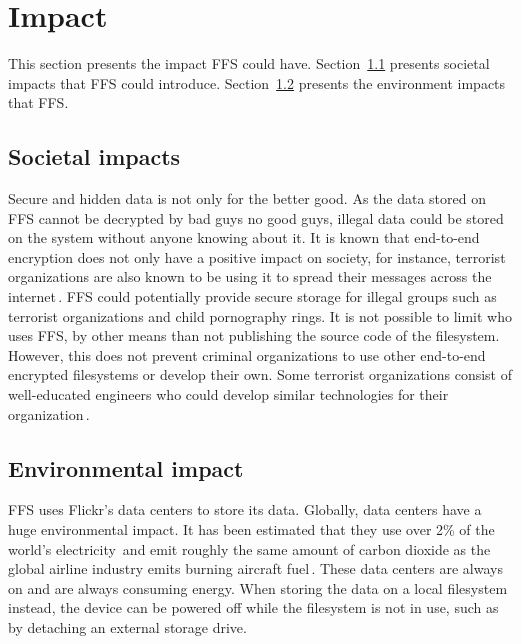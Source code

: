 \section{Impact}
This section presents the impact FFS could have. Section~\ref{subsec:imp_soc} presents societal impacts that FFS could introduce. Section~\ref{subsec:imp_env} presents the environment impacts that FFS.

\subsection{Societal impacts}
\label{subsec:imp_soc}
Secure and hidden data is not only for the better good. As the data stored on FFS cannot be decrypted by bad guys no good guys, illegal data could be stored on the system without anyone knowing about it. It is known that end-to-end encryption does not only have a positive impact on society, for instance, terrorist organizations are also known to be using it to spread their messages across the internet\,\cite{ruddEncryptionCounterterrorismGetting2017}. FFS could potentially provide secure storage for illegal groups such as terrorist organizations and child pornography rings. It is not possible to limit who uses FFS, by other means than not publishing the source code of the filesystem. However, this does not prevent criminal organizations to use other end-to-end encrypted filesystems or develop their own. Some terrorist organizations consist of well-educated engineers who could develop similar technologies for their organization\,\cite{berrebyEngineeringTerror2010}.

\subsection{Environmental impact}
\label{subsec:imp_env}
FFS uses Flickr's data centers to store its data. Globally, data centers have a huge environmental impact. It has been estimated that they use over 2\% of the world's electricity\,\cite{mcleanDataCentersGenerate2020} and emit roughly the same amount of carbon dioxide as the global airline industry emits burning aircraft fuel\,\cite{pearceEnergyHogsCan}. These data centers are always on and are always consuming energy. When storing the data on a local filesystem instead, the device can be powered off while the filesystem is not in use, such as by detaching an external storage drive.

